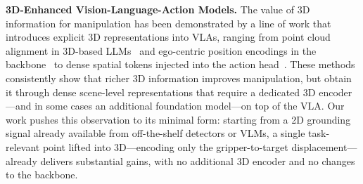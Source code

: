 \noindent\textbf{3D-Enhanced Vision-Language-Action Models.}
The value of 3D information for manipulation has been demonstrated by a line of work that introduces explicit 3D representations into VLAs, ranging from point cloud alignment in 3D-based LLMs~\cite{zhen20243dvla} and ego-centric position encodings in the backbone~\cite{spatialvla} to dense spatial tokens injected into the action head~\cite{pointvla, falcon}. These methods consistently show that richer 3D information improves manipulation, but obtain it through dense scene-level representations that require a dedicated 3D encoder---and in some cases an additional foundation model---on top of the VLA. Our work pushes this observation to its minimal form: starting from a 2D grounding signal already available from off-the-shelf detectors or VLMs, a single task-relevant point lifted into 3D---encoding only the gripper-to-target displacement---already delivers substantial gains, with no additional 3D encoder and no changes to the backbone.